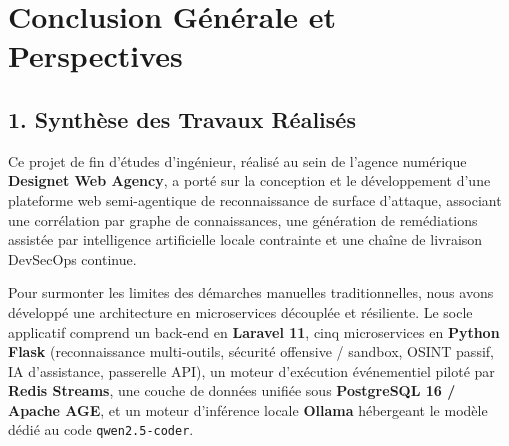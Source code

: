 \chapter*{Conclusion G\'en\'erale et Perspectives}

\section*{1. Synth\`ese des Travaux R\'ealis\'es}
\par Ce projet de fin d'\'etudes d'ing\'enieur, r\'ealis\'e au sein de l'agence num\'erique \textbf{Designet Web Agency}, a port\'e sur la conception et le d\'eveloppement d'une plateforme web semi-agentique de reconnaissance de surface d'attaque, associant une corr\'elation par graphe de connaissances, une g\'en\'eration de rem\'ediations assist\'ee par intelligence artificielle locale contrainte et une cha\^ine de livraison DevSecOps continue.
\par Pour surmonter les limites des d\'emarches manuelles traditionnelles, nous avons d\'evelopp\'e une architecture en microservices d\'ecoupl\'ee et r\'esiliente. Le socle applicatif comprend un back-end en \textbf{Laravel 11}, cinq microservices en \textbf{Python Flask} (reconnaissance multi-outils, s\'ecurit\'e offensive / sandbox, OSINT passif, IA d'assistance, passerelle API), un moteur d'ex\'ecution \'ev\'enementiel pilot\'e par \textbf{Redis Streams}, une couche de donn\'ees unifi\'ee sous \textbf{PostgreSQL 16 / Apache AGE}, et un moteur d'inf\'erence locale \textbf{Ollama} h\'ebergeant le mod\`ele d\'edi\'e au code \texttt{qwen2.5-coder}.

